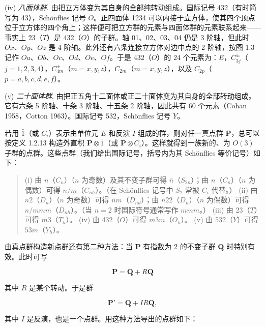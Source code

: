 (iv) \textit{八面体群}. 由把立方体变为其自身的全部纯转动组成。国际记号 432（有时简写为 43），Schönflies 记号 $O$。正四面体 1234 可以内接于立方体，使其四个顶点位于立方体的四个角上；这样便可把立方群的元素与四面体群的元素联系起来——事实上 23（$T$）是 432（$O$）的子群。轴 01、02、03、04 仍是 3 阶轴，但此时 $Ox$、$Oy$、$Oz$ 是 4 阶轴。此外还有六条连接立方体对边中点的 2 阶轴，按图 1.3 记作 $Oa$、$Ob$、$Oc$、$Od$、$Oe$、$Of$。于是 432（$O$）的 24 个元素为：$E$，$C_{3j}^{\pm}$（$j = 1, 2, 3, 4$），$C_{4m}^{\pm}$（$m = x, y, z$），$C_{2m}$（$m = x, y, z$），以及 $C_{2p}$（$p = a, b, c, d, e, f$）。

(v) \textit{二十面体群}. 由把正五角十二面体或正二十面体变为其自身的全部转动组成。它有六条 5 阶轴、十条 3 阶轴、十五条 2 阶轴，因此共有 60 个元素（Cohan 1958，Cotton 1963）。国际记号 532，Schönflies 记号 $Y$。

若用 $\bar{1}$（或 $C_{i}$）表示由单位元 $E$ 和反演 $I$ 组成的群，则对任一真点群 $\mathbf{P}$，总可以按定义 1.2.13 构造外直积 $\mathbf{P} \otimes \bar{1}$（或 $\mathbf{P} \otimes C_{i}$）。这样就得到一族新的、为 $O(3)$ 子群的点群。这些点群（我们给出国际记号，括号内为其 Schönflies 等价记号）如下：

\begin{quote}
(i) 由 $n$（$C_{n}$）（$n$ 为奇数）及其不变子群可得 $\bar{n}$（$S_{2n}$）；由 $n$（$C_{n}$）（$n$ 为偶数）可得 $n/m$（$C_{nh}$）。（在 Schönflies 记号中 $S_{2}$ 常被 $C_{i}$ 代替。）
(ii) 由 $n2$（$D_{n}$）（$n$ 为奇数）可得 $\bar{n}m$（$D_{nd}$）；由 $n22$（$D_{n}$）（$n$ 为偶数）可得 $n/mmm$（$D_{nh}$）。（当 $n = 2$ 时国际符号通常写作 $mmm$。）
(iii) 由 23（$T$）可得 $m3$（$T_{h}$）。
(iv) 由 432（$O$）可得 $m3m$（$O_{h}$）。
(v) 由 532（$Y$）可得 $\bar{5}3m$（$Y_{h}$）。
\end{quote}

由真点群构造新点群还有第二种方法：当 $\mathbf{P}$ 有指数为 2 的不变子群 $\mathbf{Q}$ 时特别有效。此时可写

\begin{equation*}
\mathbf{P} = \mathbf{Q} + R\mathbf{Q}
\tag{1.4.6}
\end{equation*}

其中 $R$ 是某个转动。于是群

\begin{equation*}
\mathbf{P}' = \mathbf{Q} + IR\mathbf{Q},
\tag{1.4.7}
\end{equation*}

其中 $I$ 是反演，也是一个点群。用这种方法导出的点群如下：

